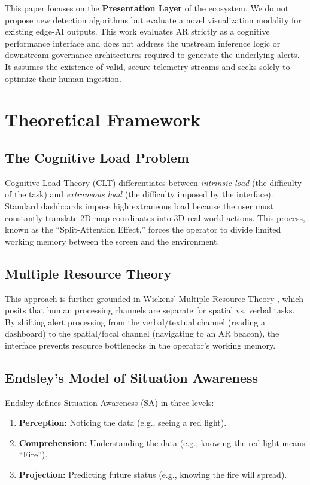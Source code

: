 \documentclass[conference]{IEEEtran}
\begin{document}
This paper focuses on the \textbf{Presentation Layer} of the ecosystem. We do not propose new detection algorithms but evaluate a novel visualization modality for existing edge-AI outputs. This work evaluates AR strictly as a cognitive performance interface and does not address the upstream inference logic or downstream governance architectures required to generate the underlying alerts. It assumes the existence of valid, secure telemetry streams and seeks solely to optimize their human ingestion.

\section{Theoretical Framework}

\subsection{The Cognitive Load Problem}
Cognitive Load Theory (CLT) differentiates between \textit{intrinsic load} (the difficulty of the task) and \textit{extraneous load} (the difficulty imposed by the interface). Standard dashboards impose high extraneous load because the user must constantly translate 2D map coordinates into 3D real-world actions. This process, known as the ``Split-Attention Effect,'' forces the operator to divide limited working memory between the screen and the environment.

\subsection{Multiple Resource Theory}
This approach is further grounded in Wickens' Multiple Resource Theory \cite{b_wickens}, which posits that human processing channels are separate for spatial vs. verbal tasks. By shifting alert processing from the verbal/textual channel (reading a dashboard) to the spatial/focal channel (navigating to an AR beacon), the interface prevents resource bottlenecks in the operator's working memory.

\subsection{Endsley's Model of Situation Awareness}
Endsley \cite{b10} defines Situation Awareness (SA) in three levels:
\begin{enumerate}
    \item \textbf{Perception:} Noticing the data (e.g., seeing a red light).
    \item \textbf{Comprehension:} Understanding the data (e.g., knowing the red light means ``Fire'').
    \item \textbf{Projection:} Predicting future status (e.g., knowing the fire will spread).
\end{enumerate}
\end{document}
